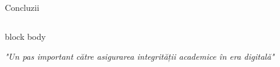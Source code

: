 \documentclass[aspectratio=169,9pt]{beamer}
\begin{document}
\begin{frame}{Concluzii}
\begin{columns}
\begin{beamercolorbox}[rounded=true,shadow=true,sep=0.7em]{block body}
                                \vspace{0.2cm}
                                
                                \begin{center}
                                        \footnotesize\itshape "Un pas important către asigurarea integrității academice în era digitală"
                                \end{center}
                        \end{beamercolorbox}
        \end{columns}
\end{frame}
\end{document}

